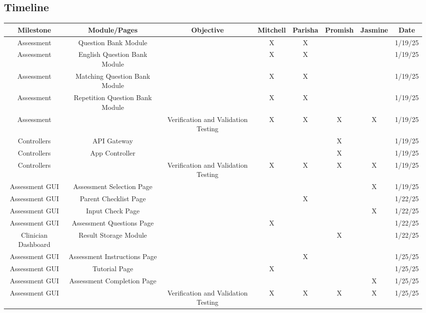 \documentclass[12pt, titlepage]{article}
\begin{document}
\newpage
\begin{landscape}
\section{Timeline}
\scriptsize
\begin{longtable}{|c|c|c|c|c|c|c|c|}
  \hline
      \textbf{Milestone} & \textbf{Module/Pages} & \textbf{Objective} & \textbf{Mitchell} & \textbf{Parisha} & \textbf{Promish} & \textbf{Jasmine} & \textbf{Date} \\ \hline
      Assessment & Question Bank Module & ~ & X & X & ~ & ~ & 1/19/25 \\ \hline
      Assessment & English Question Bank  Module & ~ & X & X & ~ & ~ & 1/19/25 \\ \hline
      Assessment & Matching Question Bank  Module & ~ & X & X & ~ & ~ & 1/19/25 \\ \hline
      Assessment & Repetition Question Bank  Module & ~ & X & X & ~ & ~ & 1/19/25 \\ \hline
      Assessment & ~ & Verification and Validation Testing & X & X & X & X & 1/19/25 \\ \hline
      Controllers & API Gateway & ~ & ~ & ~ & X & ~ & 1/19/25 \\ \hline
      Controllers & App Controller & ~ & ~ & ~ & X & ~ & 1/19/25 \\ \hline
      Controllers & ~ & Verification and Validation Testing & X & X & X & X & 1/19/25 \\ \hline
      Assessment GUI & Assessment Selection Page & ~ & ~ & ~ & ~ & X & 1/19/25 \\ \hline
      Assessment GUI & Parent Checklist Page & ~ & ~ & X & ~ & ~ & 1/22/25 \\ \hline
      Assessment GUI & Input Check Page & ~ & ~ & ~ & ~ & X & 1/22/25 \\ \hline
      Assessment GUI & Assessment Questions Page & ~ & X & ~ & ~ & ~ & 1/22/25 \\ \hline
      Clinician Dashboard & Result Storage Module & ~ & ~ & ~ & X & ~ & 1/22/25 \\ \hline
      Assessment GUI & Assessment Instructions Page & ~ & ~ & X & ~ & ~ & 1/25/25 \\ \hline
      Assessment GUI & Tutorial Page & ~ & X & ~ & ~ & ~ & 1/25/25 \\ \hline
      Assessment GUI & Assessment Completion Page & ~ & ~ & ~ & ~ & X & 1/25/25 \\ \hline
      Assessment GUI & ~ & Verification and Validation Testing & X & X & X & X & 1/25/25 \\ \hline

\end{longtable}
\end{landscape}
\end{document}
